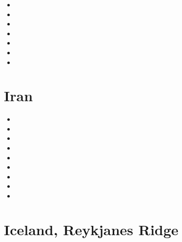 \begin{scriptsize}
\begin{itemize}
\item[\nineteeneighty] 
\item[\twothousandfive]
\item[\twothousandeight]
\item[\twothousandthirteen]
\item[\twothousandfourteen] 
\item[\twothousandfifteen] 
\item[\twothousand]
\end{itemize}
\end{scriptsize}

\section{Iran}

\begin{scriptsize}
\begin{itemize}
\item[\twothousandthree] 
\item[\twothousandsix] 
\item[\twothousandten] 
\item[\twothousandeleven] 
\item[\twothousandthirteen] 
\item[\twothousandfourteen] 
\item[\twothousandsixteen] 
\item[\twothousandtwenty] 
\item[\twothousandtwentythree] 
\end{itemize}
\end{scriptsize} 
 
\section{Iceland, Reykjanes Ridge}

